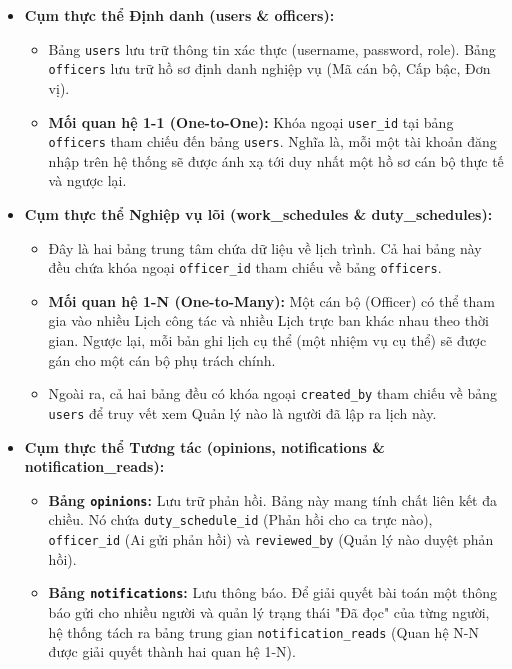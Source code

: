 \documentclass[18pt,a4paper]{report}
\begin{document}
\begin{itemize}[leftmargin=1.2cm]
    \item \textbf{Cụm thực thể Định danh (users \& officers):}
    \begin{itemize}
        \item Bảng \texttt{users} lưu trữ thông tin xác thực (username, password, role). Bảng \texttt{officers} lưu trữ hồ sơ định danh nghiệp vụ (Mã cán bộ, Cấp bậc, Đơn vị).
        \item \textbf{Mối quan hệ 1-1 (One-to-One):} Khóa ngoại \texttt{user\_id} tại bảng \texttt{officers} tham chiếu đến bảng \texttt{users}. Nghĩa là, mỗi một tài khoản đăng nhập trên hệ thống sẽ được ánh xạ tới duy nhất một hồ sơ cán bộ thực tế và ngược lại.
    \end{itemize}
    
    \item \textbf{Cụm thực thể Nghiệp vụ lõi (work\_schedules \& duty\_schedules):}
    \begin{itemize}
        \item Đây là hai bảng trung tâm chứa dữ liệu về lịch trình. Cả hai bảng này đều chứa khóa ngoại \texttt{officer\_id} tham chiếu về bảng \texttt{officers}.
        \item \textbf{Mối quan hệ 1-N (One-to-Many):} Một cán bộ (Officer) có thể tham gia vào nhiều Lịch công tác và nhiều Lịch trực ban khác nhau theo thời gian. Ngược lại, mỗi bản ghi lịch cụ thể (một nhiệm vụ cụ thể) sẽ được gán cho một cán bộ phụ trách chính.
        \item Ngoài ra, cả hai bảng đều có khóa ngoại \texttt{created\_by} tham chiếu về bảng \texttt{users} để truy vết xem Quản lý nào là người đã lập ra lịch này.
    \end{itemize}

    \item \textbf{Cụm thực thể Tương tác (opinions, notifications \& notification\_reads):}
    \begin{itemize}
        \item \textbf{Bảng \texttt{opinions}:} Lưu trữ phản hồi. Bảng này mang tính chất liên kết đa chiều. Nó chứa \texttt{duty\_schedule\_id} (Phản hồi cho ca trực nào), \texttt{officer\_id} (Ai gửi phản hồi) và \texttt{reviewed\_by} (Quản lý nào duyệt phản hồi).
        \item \textbf{Bảng \texttt{notifications}:} Lưu thông báo. Để giải quyết bài toán một thông báo gửi cho nhiều người và quản lý trạng thái "Đã đọc" của từng người, hệ thống tách ra bảng trung gian \texttt{notification\_reads} (Quan hệ N-N được giải quyết thành hai quan hệ 1-N).
    \end{itemize}


\end{itemize}
\end{document}
